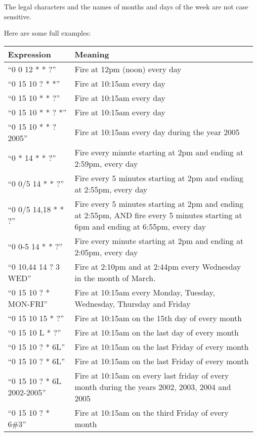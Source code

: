 \documentclass{InsightBook}
\begin{document}
The legal characters and the names of months and days of the week are
not case sensitive.

Here are some full examples:

\begin{tabular}{lp{12cm}}
Expression&             Meaning\\
\hline
``0 0 12 * * ?''          &Fire at 12pm (noon) every day \\
``0 15 10 ? * *''                 &Fire at 10:15am every day \\
``0 15 10 * * ?''                 &Fire at 10:15am every day \\
``0 15 10 * * ? *''               &Fire at 10:15am every day \\
``0 15 10 * * ? 2005''            &Fire at 10:15am every day during the
year 2005 \\
``0 * 14 * * ?''          &Fire every minute starting at 2pm and ending
at 2:59pm, every day \\
``0 0/5 14 * * ?''                &Fire every 5 minutes starting at 2pm
and ending at 2:55pm, every day \\
``0 0/5 14,18 * * ?''             &Fire every 5 minutes starting at 2pm
and ending at 2:55pm, AND fire every 5 minutes starting at 6pm and
ending at 6:55pm, every day \\
``0 0-5 14 * * ?''                &Fire every minute starting at 2pm and
ending at 2:05pm, every day \\
``0 10,44 14 ? 3 WED''            &Fire at 2:10pm and at 2:44pm every
Wednesday in the month of March. \\
``0 15 10 ? * MON-FRI''           &Fire at 10:15am every Monday,
Tuesday, Wednesday, Thursday and Friday \\
``0 15 10 15 * ?''                &Fire at 10:15am on the 15th day of
every month \\
``0 15 10 L * ?''                 &Fire at 10:15am on the last day of
every month \\
``0 15 10 ? * 6L''                &Fire at 10:15am on the last Friday of
every month \\
``0 15 10 ? * 6L''                &Fire at 10:15am on the last Friday of
every month \\
``0 15 10 ? * 6L 2002-2005''              &Fire at 10:15am on every last
friday of every month during the years 2002, 2003, 2004 and 2005 \\
``0 15 10 ? * 6\#3''              &Fire at 10:15am on the third Friday
of every month \\
\end{tabular}
\end{document}
